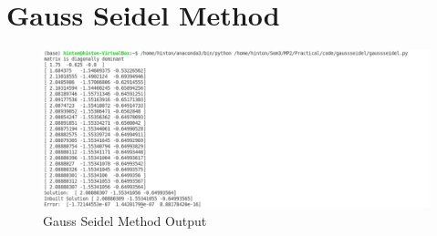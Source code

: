 \documentclass{article}
\begin{document}
\section{Gauss Seidel Method}


\newpage
\begin{figure}[h]
    \centering
    \includegraphics[width=15cm,height=8cm \textwidth]{Gauss_Seidel/Capture.PNG}
\caption{Gauss Seidel Method Output}
\end{figure}
\end{document}
